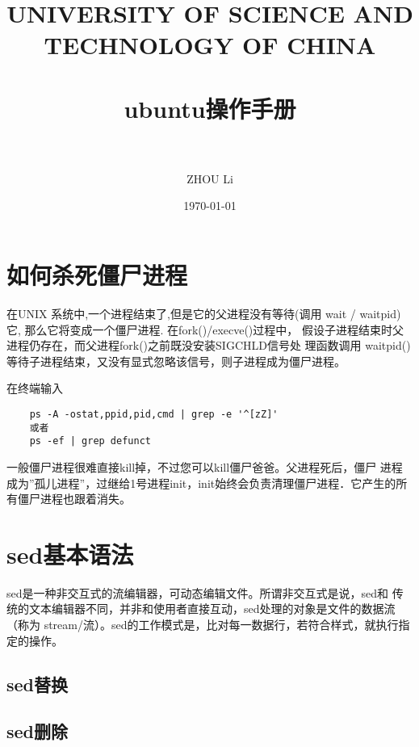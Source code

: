 \documentclass[20pt]{article}
\title{
        \normalfont \normalsize
        {UNIVERSITY OF SCIENCE AND TECHNOLOGY OF CHINA} \\ [25pt]
        \horrule{0.8pt} \\[0.4cm]
        \LARGE {ubuntu操作手册} \\
        \horrule{2pt} \\[0.5cm]
       }
\author{ZHOU Li}
\date  {\normalsize\today}
\numberwithin{equation}{section}
\numberwithin{figure}{section}
\numberwithin{table}{section}
\begin{document}
\maketitle
\newpage
\tableofcontents
\newpage
\noindent\LARGE\section{\color{blue}如何杀死僵尸进程}
\normalsize{在UNIX 系统中,一个进程结束了,但是它的父进程没有等待(调用
wait / waitpid)它, 那么它将变成一个僵尸进程.  在fork()/execve()过程中，
假设子进程结束时父进程仍存在，而父进程fork()之前既没安装SIGCHLD信号处
理函数调用 waitpid()等待子进程结束，又没有显式忽略该信号，则子进程成为僵尸进程。}
\begin{spacing}{2.0} 
\noindent\large\color{Green}{Step 1.查看僵尸进程}
\end{spacing}
在终端输入
{\small\color{Brown}\begin{verbatim}
    ps -A -ostat,ppid,pid,cmd | grep -e '^[zZ]'
    或者
    ps -ef | grep defunct
\end{verbatim}}
\begin{spacing}{2.0}
\noindent\large\color{Green}{Step 2.杀死僵尸进程}
\end{spacing}
\normalsize{一般僵尸进程很难直接kill掉，不过您可以kill僵尸爸爸。父进程死后，僵尸
 进程成为”孤儿进程”，过继给1号进程init，init始终会负责清理僵尸进程．它产生的所
 有僵尸进程也跟着消失。}
{}
\noindent\LARGE\section{\color{blue}sed基本语法}
\normalsize{sed是一种非交互式的流编辑器，可动态编辑文件。所谓非交互式是说，sed和
传统的文本编辑器不同，并非和使用者直接互动，sed处理的对象是文件的数据流（称为
stream/流）。sed的工作模式是，比对每一数据行，若符合样式，就执行指定的操作。}
\noindent\large\subsection{\color{blue}sed替换}
{\color{Brown}{\begin{verbatim}
    sed -i 's/string1/string2/g' filename
\end{verbatim}}}
\noindent\large\subsection{\color{blue}sed删除}
{\color{Brown}{\begin{verbatim}
    1.删除某一段范围的数据行
    sed '1,4d' filename
    2.删除含某一字符或字符串的数据行
    sed '/string/d' filename
    3.删除空行
    sed '/^$/d' filename
\end{verbatim}}}
\end{document}
